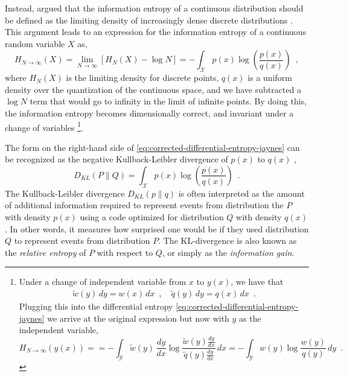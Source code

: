 Instead, \textcite{jaynes_information_1957} argued that the information entropy of a continuous distribution should be defined as the limiting density of increasingly dense discrete distributions \cite{jaynes_prior_1968}. This argument leads to an expression for the information entropy of a continuous random variable $X$ as,
%
\begin{equation} \label{eq:corrected-differential-entropy-jaynes}
    H_{N\rightarrow\infty}(X) = \lim_{N\rightarrow\infty} [H_{N}(X) - \log N] = - \int_\mathcal{X} p(x) \log \left(\frac{p(x)}{q(x)}\right) \enspace ,
\end{equation}
%
where $H_N(X)$ is the limiting density for discrete points, $q(x)$ is a uniform density over the quantization of the continuous space, and we have subtracted a $\log N$ term that would go to infinity in the limit of infinite points.
By doing this, the information entropy becomes dimensionally correct, and invariant under a change of variables%
\footnote{\label{fn:change-of-variables-invariance-of-corrected-differential-entropy}
    Under a change of independent variable from $x$ to $y(x)$, we have that
    \begin{align*}
        \widetilde{w}(y)\,dy = w(x)\,dx \enspace , \quad
        \widetilde{q}(y)\,dy = q(x)\,dx \enspace .
    \end{align*}
    Plugging this into the differential entropy \cref{eq:corrected-differential-entropy-jaynes} we arrive at the original expression but now with $y$ as the independent variable,
    \begin{equation*}
        H_{N\rightarrow\infty}(y(x)) =  = - \int_\mathcal{Y} \widetilde{w}(y)\,\frac{dy}{dx} \log \frac{\widetilde{w}(y)\frac{dy}{dx}}{\widetilde{q}(y)\frac{dy}{dx}} \, dx = - \int_\mathcal{Y} w(y) \log \frac{w(y)}{q(y)} \, dy \enspace .
    \end{equation*}
}.

The form on the right-hand side of \cref{eq:corrected-differential-entropy-jaynes} can be recognized as the negative Kullback-Leibler divergence of $p(x)$ to $q(x)$ \cite{kullback_information_1959},
%
\begin{equation} \label{eq:kullback-leibler-divergence}
    D_{KL}(P\parallel Q) = \int_\mathcal{X} p(x) \log \left(\frac{p(x)}{q(x)}\right) \enspace .
\end{equation}
%
The Kullback-Leibler divergence $D_{KL}(p\parallel q)$ is often interpreted as the amount of additional information required to represent events from distribution the $P$ with density $p(x)$ using a code optimized for distribution $Q$ with density $q(x)$. In other words, it measures how surprised one would be if they used distribution $Q$ to represent events from distribution $P$.
The KL-divergence is also known as the \emph{relative entropy} of $P$ with respect to $Q$, or simply as the \emph{information gain}. 

